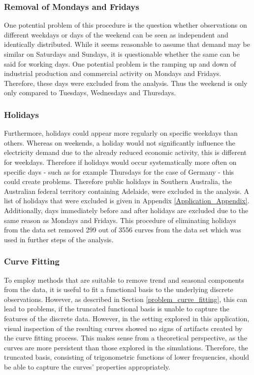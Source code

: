 \documentclass[12pt, a4paper]{article}
\theoremstyle{MAstyle} \newtheorem{assumption}{Assumption}[section]
\theoremstyle{MAstyle} \newtheorem{definition}{Definition}[section]
\theoremstyle{MAstyle} \newtheorem{theorem}{Theorem}[section]
\begin{document}
			\subsubsection{Removal of Mondays and Fridays}
			One potential problem of this procedure is the question whether observations on different weekdays or days of the weekend can be seen as independent and identically distributed. While it seems reasonable to assume that demand may be similar on Saturdays and Sundays, it is questionable whether the same can be said for working days. 
			One potential problem is the ramping up and down of industrial production and commercial activity on Mondays and Fridays. Therefore, these days were excluded from the analysis. Thus the weekend is only only compared to Tuesdays, Wednesdays and Thursdays.
			
			\subsubsection{Holidays}
			Furthermore, holidays could appear more regularly on specific weekdays than others. Whereas on weekends, a holiday would not significantly influence the electricity demand due to the already reduced economic activity, this is different for weekdays. Therefore if holidays would occur systematically more often on specific days - such as for example Thursdays for the case of Germany - this could create problems. Therefore public holidays in Southern Australia, the Australian federal territory containing Adelaide, were excluded in the analysis. A list of holidays that were excluded is given in Appendix \ref{Application_Appendix}. Additionally, days immediately before and after holidays are excluded due to the same reason as Mondays and Fridays. This procedure of eliminating holidays from the data set removed 299 out of 3556 curves from the data set which was used in further steps of the analysis. 
			
			\subsubsection{Curve Fitting}
			To employ methods that are suitable to remove trend and seasonal components from the data, it is useful to fit a functional basis to the underlying discrete observations. However, as described in Section \ref{problem_curve_fitting}, this can lead to problems, if the truncated functional basis is unable to capture the features of the discrete data. However, in the setting explored in this application, visual inspection of the resulting curves showed no signs of artifacts created by the curve fitting process. This makes sense from a theoretical perspective, as the curves are more persistent than those explored in the simulations. Therefore, the truncated basis, consisting of trigonometric functions of lower frequencies, should be able to capture the curves' properties appropriately.
			
\end{document}
